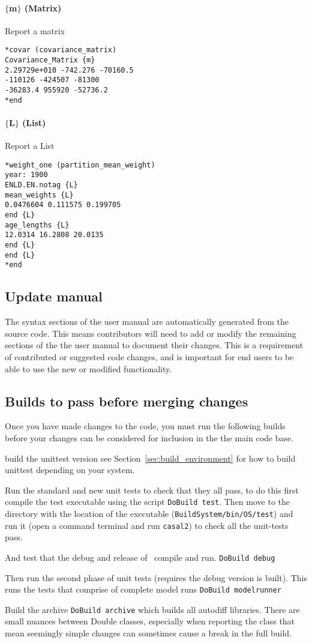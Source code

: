 \paragraph*{$\{$m$\}$ (Matrix)}
Report a matrix
{\small{\begin{verbatim}
*covar (covariance_matrix)
Covariance_Matrix {m}
2.29729e+010 -742.276 -70160.5
-110126 -424507 -81300 
-36283.4 955920 -52736.2 
*end
\end{verbatim}}}

\paragraph*{$\{$L$\}$ (List)}
Report a List
{\small{\begin{verbatim}
*weight_one (partition_mean_weight)
year: 1900
ENLD.EN.notag {L}
mean_weights {L}
0.0476604 0.111575 0.199705
end {L}
age_lengths {L}
12.0314 16.2808 20.0135
end {L}
end {L}
*end
\end{verbatim}}}

\subsection{Update manual}
The syntax sections of the user manual are automatically generated from the source code. This means contributors will need to add or modify the remaining sections of the the user manual to document their changes. This is a requirement of contributed or suggested code changes, and is important for end users to be able to use the new or modified functionality.

\subsection{Builds to pass before merging changes}

Once you have made changes to the code, you must run the following builds before your changes can be considered for inclusion in the the main code base. 

build the unittest version see Section~\ref{sec:build_environment} for how to build unittest depending on your system.

Run the standard and new unit tests to check that they all pass, to do this first compile the test executable using the script \texttt{DoBuild test}. Then move to the directory with the location of the executable (\texttt{BuildSystem/bin/OS/test}) and run it (open a command terminal and run \texttt{casal2}) to check all the unit-tests pass.

And test that the debug and release of \CNAME\ compile and run.
\texttt{DoBuild debug}

Then run the second phase of unit tests (requires the debug version is built). This runs the tests that comprise of complete model runs
\texttt{DoBuild modelrunner}

Build the archive 
\texttt{DoBuild archive} which builds all autodiff libraries. There are small nuances between Double classes, especially when reporting the class that mean seemingly simple changes can sometimes cause a break in the full build.


